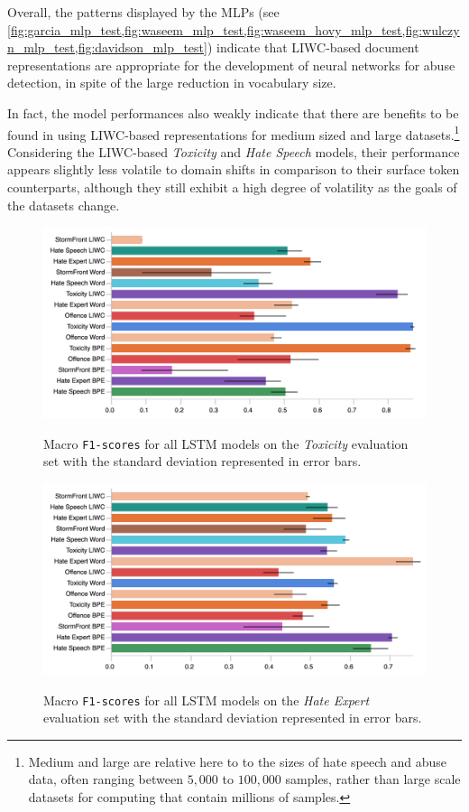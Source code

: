 Overall, the patterns displayed by the MLPs (see \cref{fig:garcia_mlp_test,fig:waseem_mlp_test,fig:waseem_hovy_mlp_test,fig:wulczyn_mlp_test,fig:davidson_mlp_test}) indicate that LIWC-based document representations are appropriate for the development of neural networks for abuse detection, in spite of the large reduction in vocabulary size.  
  
In fact, the model performances also weakly indicate that there are benefits to be found in using LIWC-based representations for medium sized and large datasets.\footnote{Medium and large are relative here to to the sizes of hate speech and abuse data, often ranging between $5,000$ to $100,000$ samples, rather than large scale datasets for computing that contain millions of samples.}  
Considering the LIWC-based \textit{Toxicity} and \textit{Hate Speech} models, their performance appears slightly less volatile to domain shifts in comparison to their surface token counterparts, although they still exhibit a high degree of volatility as the goals of the datasets change.  
  
\begin{figure}  
\begin{minipage}{\textwidth}  
    \centering  
    \includegraphics[width=\textwidth]{all_lstm_wulczyn_test.pdf}  
    \caption{Macro \texttt{F1-scores} for all LSTM models on the \textit{Toxicity} evaluation set with the standard deviation represented in error bars.}  
    \label{fig:wulczyn_lstm_test}  
  \vfill  
    \includegraphics[width=\textwidth]{all_lstm_waseem_test.pdf}  
    \caption{Macro \texttt{F1-scores} for all LSTM models on the \textit{Hate Expert} evaluation set with the standard deviation represented in error bars.}  
    \label{fig:waseem_lstm_test}  
\end{minipage}  
\end{figure}  
  
